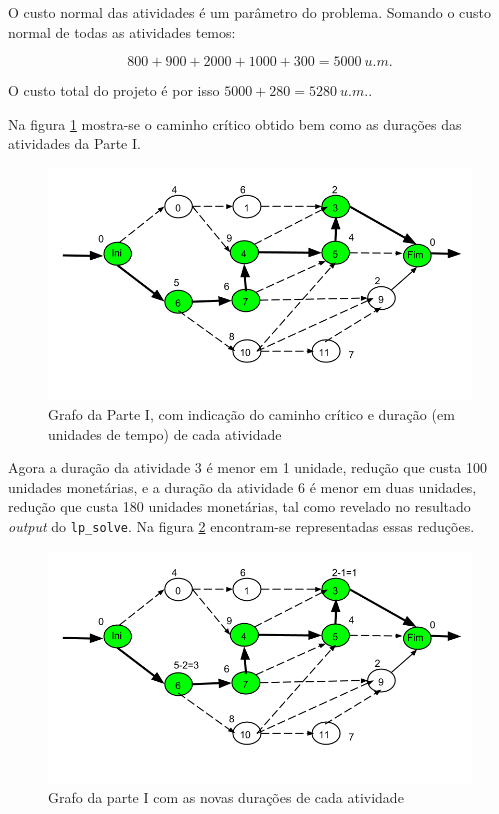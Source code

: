 O custo normal das atividades é um parâmetro do problema. Somando o custo normal de todas as atividades temos:

\begin{displaymath}
800 + 900 + 2000 + 1000 + 300 = 5000~u.m.
\end{displaymath}

O custo total do projeto é por isso $5000 + 280 = 5280~u.m.$.

Na figura \ref{p3:fig:caminho_critico_sem_red} mostra-se o caminho crítico obtido bem como as durações das atividades da Parte I.

\begin{figure}[H]
	\centering
	\includegraphics[scale=0.5]{./img/p1_caminho_critico}
	\caption{Grafo da Parte I, com indicação do caminho crítico e duração (em unidades de tempo) de cada atividade}
	\label{p3:fig:caminho_critico_sem_red}
\end{figure}

Agora a duração da atividade 3 é menor em 1 unidade, redução que custa 100 unidades monetárias, e a duração da atividade 6 é menor em duas unidades, redução que custa 180 unidades monetárias, tal como revelado no resultado \emph{output} do \texttt{lp\_solve}. Na figura \ref{p3:fig:caminho_critico_com_red} encontram-se representadas essas reduções.

\begin{figure}[H]
	\centering
	\includegraphics[scale=0.5]{./img/p3_caminho_critico_com_red}
	\caption{Grafo da parte I com as novas durações de cada atividade}
	\label{p3:fig:caminho_critico_com_red}
\end{figure}
 
